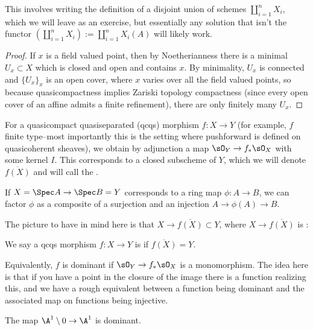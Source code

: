 This involves writing the definition of a disjoint union of schemes $\coprod_{i = 1}^nX_i$, which we will leave as an exercise, but essentially any solution that isn't the functor $(\coprod_{i = 1}^nX_i) := \coprod_{i = 1}^nX_i(A)$ will likely work. 

\begin{proof}
If $x$ is a field valued point, then by Noetherianness there is a minimal $U_x \subset X$ which is closed and open and contains $x$. By minimality, $U_x$ is connected and $\{U_x\}_{x}$ is an open cover, where $x$ varies over all the field valued points, so because quasicompactness implies Zariski topology compactness (since every open cover of an affine admits a finite refinement), there are only finitely many $U_x$. 
\end{proof}

\begin{defn}
For a quasicompact quasiseparated (qcqs) morphism $f: X \to Y$ (for example, $f$ finite type--most importantly this
is the setting where pushforward is defined on quasicoherent sheaves), we obtain by adjunction a map $\sO_Y \to
f_*\sO_X$ with some kernel $I$. This corresponds to a closed subscheme of $Y$, which we will denote
$\overline{f(X)}$ and will call the . 
\end{defn}

\begin{ex} If $X = \Spec A \to \Spec B = Y$ corresponds to a ring map $\phi: A \to B$, we can factor $\phi$ as a composite of a surjection and an injection $A \to \phi(A) \to B$. 
\end{ex}

The picture to have in mind here is that $X \to \overline{f(X)} \subset Y$, where $X \to \overline{f(X)}$ is :

\begin{defn}
We say a qcqs morphism $f: X \to Y$ is  if $\overline{f(X)} = Y$. 
\end{defn}

Equivalently, $f$ is dominant if $\sO_Y \to f_*\sO_X$ is a monomorphism. The idea here is that if you have a point
in the closure of the image there is a function realizing this, and we have a rough equivalent between a function
being dominant and the associated map on functions being injective.

\begin{exampx}
The map $\A^1 \setminus 0 \to \A^1$ is dominant. 
\end{exampx}


